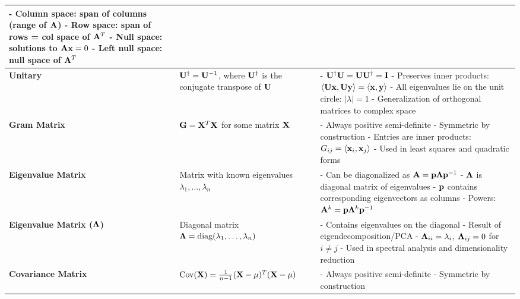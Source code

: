 \documentclass[12pt]{article}
\begin{document}
\begin{longtable}{|>{\bfseries}m{3.5cm}|m{5cm}|m{10.5cm}|}
		- Column space: span of columns (range of $\mathbf{A}$) \newline
		- Row space: span of rows = col space of $\mathbf{A}^T$ \newline
		- Null space: solutions to $\mathbf{A}\mathbf{x} = 0$ \newline
		- Left null space: null space of $\mathbf{A}^T$ \\
		\hline
		Unitary & $\mathbf{U}^\dagger = \mathbf{U}^{-1}$, where $\mathbf{U}^\dagger$ is the conjugate
		transpose of $\mathbf{U}$ &
		- $\mathbf{U}^\dagger \mathbf{U} = \mathbf{U} \mathbf{U}^\dagger = \mathbf{I}$ \newline
		- Preserves inner products: $\langle \mathbf{U}\mathbf{x}, \mathbf{U}\mathbf{y} \rangle =
		\langle \mathbf{x}, \mathbf{y} \rangle$ \newline
		- All eigenvalues lie on the unit circle: $|\lambda| = 1$ \newline
		- Generalization of orthogonal matrices to complex space \\
		\hline
		Gram Matrix & $\mathbf{G} = \mathbf{X}^T \mathbf{X}$ for some matrix $\mathbf{X}$ &
		- Always positive semi-definite \newline
		- Symmetric by construction \newline
		- Entries are inner products: $G_{ij} = \langle \mathbf{x}_i, \mathbf{x}_j \rangle$ \newline
		- Used in least squares and quadratic forms \\
		\hline
		Eigenvalue Matrix & Matrix with known eigenvalues $\lambda_1, \ldots, \lambda_n$ &
		- Can be diagonalized as $\mathbf{A} = \mathbf{p}\mathbf{\Lambda} \mathbf{p}^{-1}$ \newline
		- $\mathbf{\Lambda}$ is diagonal matrix of eigenvalues \newline
		- $\mathbf{p}$ contains corresponding eigenvectors as columns \newline
		- Powers: $\mathbf{A}^k = \mathbf{p}\mathbf{\Lambda}^k \mathbf{p}^{-1}$ \\
		\hline
		Eigenvalue Matrix ($\mathbf{\Lambda}$) & Diagonal matrix $\mathbf{\Lambda} = \text{diag}(\lambda_1,
		\ldots, \lambda_n)$ &
		- Contains eigenvalues on the diagonal \newline
		- Result of eigendecomposition/PCA \newline
		- $\mathbf{\Lambda}_{ii} = \lambda_i$, $\mathbf{\Lambda}_{ij} = 0$ for $i \neq j$ \newline
		- Used in spectral analysis and dimensionality reduction \\
		\hline
		Covariance Matrix & $\text{Cov}(\mathbf{X}) = \frac{1}{n-1}(\mathbf{X} - \mu)^T(\mathbf{X} - \mu)$ &
		- Always positive semi-definite \newline
		- Symmetric by construction \newline

\end{longtable}
\end{document}
